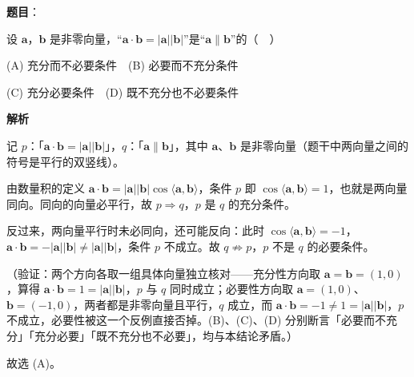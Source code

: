 \begin{answer}

\textbf{题目}：

设 \(\boldsymbol{a}\)，\(\boldsymbol{b}\) 是非零向量，“\(\boldsymbol{a}\cdot\boldsymbol{b}=|\boldsymbol{a}||\boldsymbol{b}|\)”是“\(\boldsymbol{a}\parallel\boldsymbol{b}\)”的（　）

(A) 充分而不必要条件　(B) 必要而不充分条件

(C) 充分必要条件　(D) 既不充分也不必要条件

\textbf{解析}

记 \(p\)：「\(\boldsymbol{a}\cdot\boldsymbol{b}=|\boldsymbol{a}||\boldsymbol{b}|\)」，\(q\)：「\(\boldsymbol{a}\parallel\boldsymbol{b}\)」，其中 \(\boldsymbol{a}\)、\(\boldsymbol{b}\) 是非零向量（题干中两向量之间的符号是平行的双竖线）。

由数量积的定义 \(\boldsymbol{a}\cdot\boldsymbol{b}=|\boldsymbol{a}||\boldsymbol{b}|\cos\langle\boldsymbol{a},\boldsymbol{b}\rangle\)，条件 \(p\) 即 \(\cos\langle\boldsymbol{a},\boldsymbol{b}\rangle=1\)，也就是两向量同向。同向的向量必平行，故 \(p\Rightarrow q\)，\(p\) 是 \(q\) 的充分条件。

反过来，两向量平行时未必同向，还可能反向：此时 \(\cos\langle\boldsymbol{a},\boldsymbol{b}\rangle=-1\)，\(\boldsymbol{a}\cdot\boldsymbol{b}=-|\boldsymbol{a}||\boldsymbol{b}|\neq|\boldsymbol{a}||\boldsymbol{b}|\)，条件 \(p\) 不成立。故 \(q\not\Rightarrow p\)，\(p\) 不是 \(q\) 的必要条件。

（验证：两个方向各取一组具体向量独立核对——充分性方向取 \(\boldsymbol{a}=\boldsymbol{b}=(1,0)\)，算得 \(\boldsymbol{a}\cdot\boldsymbol{b}=1=|\boldsymbol{a}||\boldsymbol{b}|\)，\(p\) 与 \(q\) 同时成立；必要性方向取 \(\boldsymbol{a}=(1,0)\)、\(\boldsymbol{b}=(-1,0)\)，两者都是非零向量且平行，\(q\) 成立，而 \(\boldsymbol{a}\cdot\boldsymbol{b}=-1\neq1=|\boldsymbol{a}||\boldsymbol{b}|\)，\(p\) 不成立，必要性被这一个反例直接否掉。(B)、(C)、(D) 分别断言「必要而不充分」「充分必要」「既不充分也不必要」，均与本结论矛盾。）

故选 (A)。


\end{answer}
